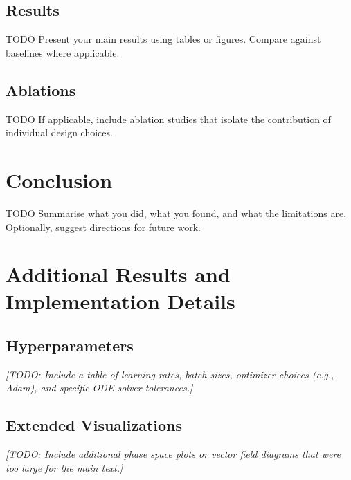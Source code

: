 \documentclass{article}
\begin{document}
\subsection{Results}

TODO
Present your main results using tables or figures.
Compare against baselines where applicable.

\subsection{Ablations}

TODO
If applicable, include ablation studies that isolate the contribution
of individual design choices.

\section{Conclusion}

TODO
Summarise what you did, what you found, and what the limitations are.
Optionally, suggest directions for future work.

\small



\normalsize
\newpage
\appendix

\section{Additional Results and Implementation Details}

\subsection{Hyperparameters}
\textit{[TODO: Include a table of learning rates, batch sizes, optimizer choices (e.g., Adam), and specific ODE solver tolerances.]}

\subsection{Extended Visualizations}
\textit{[TODO: Include additional phase space plots or vector field diagrams that were too large for the main text.]}
\end{document}
